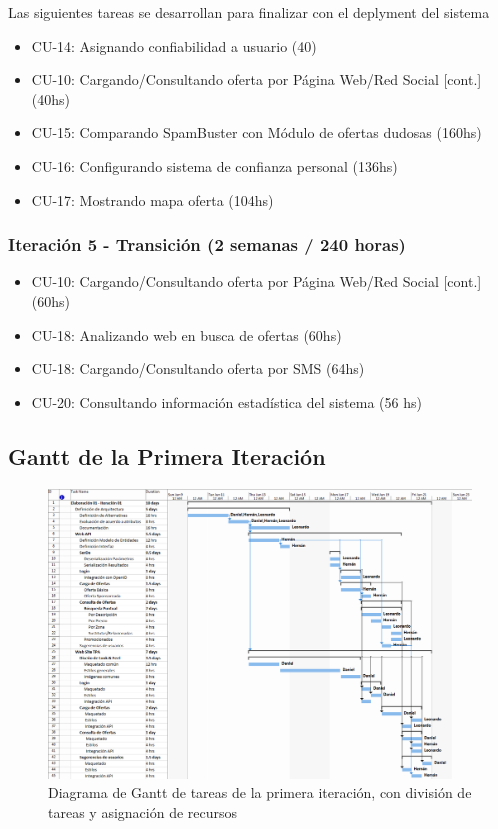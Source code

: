 	Las siguientes tareas se desarrollan para finalizar con el deplyment del sistema
	
	\begin{itemize}
	  	  \item CU-14: Asignando confiabilidad a usuario (40)
		  \item CU-10: Cargando/Consultando oferta por P\'agina Web/Red Social [cont.] (40hs)
		  \item CU-15: Comparando SpamBuster con M\'odulo de ofertas dudosas (160hs)
		  \item CU-16: Configurando sistema de confianza personal (136hs)
		  \item CU-17: Mostrando mapa oferta (104hs)
	\end{itemize}

\subsubsection{Iteraci\'on 5 - Transici\'on (2 semanas / 240 horas)}
	
	\begin{itemize}
		  \item CU-10: Cargando/Consultando oferta por P\'agina Web/Red Social [cont.] (60hs)
		  \item CU-18: Analizando web en busca de ofertas (60hs)
		  \item CU-18: Cargando/Consultando oferta por SMS (64hs)
		  \item CU-20: Consultando informaci\'on estad\'istica del sistema (56 hs)
	\end{itemize}

\subsection*{Gantt de la Primera Iteraci\'on}
\begin{figure}[hbtp]
\centering
\includegraphics[height=0.75\textheight,angle=90]{TP2Planificacion}
\caption{Diagrama de Gantt de tareas de la primera iteraci\'on, con divisi\'on de tareas y asignaci\'on de recursos}
\label{fig:gantt}
\end{figure}
